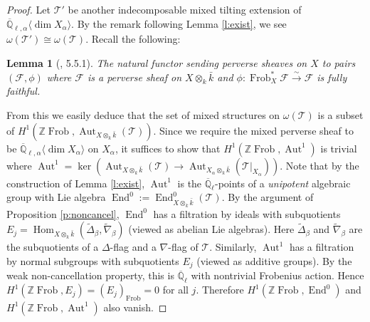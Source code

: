 \documentclass{amsart}
\theoremstyle{plain}
\newtheorem{lemma}[subsubsection]{Lemma}
\theoremstyle{definition}
\theoremstyle{remark}
\numberwithin{equation}{subsection}
\begin{document}
\begin{proof}
Let ${\mathcal{T}}'$ be another indecomposable mixed tilting extension of ${\overline{\mathbb{Q}}_{\ell,\alpha}{\langle{{\dim X_\alpha}}\rangle}}$. By the remark following Lemma \ref{l:exist}, we see $\omega({\mathcal{T}}')\cong\omega({\mathcal{T}})$. Recall the following:

\begin{lemma}[\cite{BBD}, 5.5.1] The natural functor sending perverse sheaves on $X$ to pairs $({\mathcal{F}},\phi)$ where ${\mathcal{F}}$ is a perverse sheaf on ${{X}\otimes_k\bar{k}}$ and $\phi: \operatorname{Frob}_X^*{\mathcal{F}}\stackrel{\sim}{\to}{\mathcal{F}}$ is fully faithful.
\end{lemma}

From this we easily deduce that the set of mixed structures on $\omega({\mathcal{T}})$ is a subset of $H^1({\mathbb{Z}}\operatorname{Frob},\operatorname{Aut}_{{{X}\otimes_k\bar{k}}}({\mathcal{T}}))$. Since we require the mixed perverse sheaf to be ${\overline{\mathbb{Q}}_{\ell,\alpha}{\langle{{\dim X_\alpha}}\rangle}}$ on $X_\alpha$, it suffices to show that $H^1({\mathbb{Z}}\operatorname{Frob},\operatorname{Aut}^1)$ is trivial where $\operatorname{Aut}^1=\ker(\operatorname{Aut}_{{{X}\otimes_k\bar{k}}}({\mathcal{T}})\to\operatorname{Aut}_{{{X_\alpha}\otimes_k\bar{k}}}({\mathcal{T}}|_{X_\alpha}))$. Note that by the construction of Lemma \ref{l:exist}, $\operatorname{Aut}^1$ is the ${\overline{\mathbb{Q}}_{\ell}}$-points of a {\em unipotent} algebraic group with Lie algebra $\operatorname{End}^0:=\operatorname{End}^0_{{{X}\otimes_k\bar{k}}}({\mathcal{T}})$. By the argument of Proposition \ref{p:noncancel}, $\operatorname{End}^0$ has a filtration by ideals with subquotients $E_j=\operatorname{Hom}_{{{X}\otimes_k\bar{k}}}({\widetilde{\Delta}}_\beta,{\widetilde{\nabla}}_\beta)$ (viewed as abelian Lie algebras). Here ${\widetilde{\Delta}}_\beta$ and ${\widetilde{\nabla}}_\beta$ are the subquotients of a $\Delta$-flag and a $\nabla$-flag of ${\mathcal{T}}$. Similarly, $\operatorname{Aut}^1$ has a filtration by normal subgroups with subquotients $E_j$ (viewed as additive groups). By the weak non-cancellation property, this is ${\overline{\mathbb{Q}}_{\ell}}$ with nontrivial Frobenius action. Hence $H^1({\mathbb{Z}}\operatorname{Frob},E_j)=(E_j)_\operatorname{Frob}=0$ for all $j$. Therefore $H^1({\mathbb{Z}}\operatorname{Frob}, \operatorname{End}^0)$ and $H^1({\mathbb{Z}}\operatorname{Frob}, \operatorname{Aut}^1)$ also vanish.
\end{proof}
\end{document}
